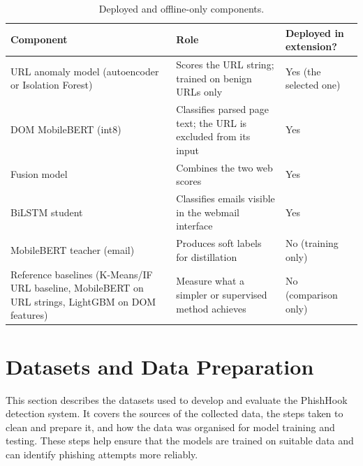 \documentclass{FastFyp}
\begin{document}
\begin{table}[!ht]
\centering
\caption{Deployed and offline-only components.}
\label{tab:components}
\begin{tabularx}{\textwidth}{|>{\raggedright\arraybackslash}X|>{\raggedright\arraybackslash}X|>{\raggedright\arraybackslash}X|}
\hline
\textbf{Component} & \textbf{Role} & \textbf{Deployed in extension?} \\
\hline
URL anomaly model (autoencoder or Isolation Forest) & Scores the URL string; trained on benign URLs only & Yes (the selected one) \\
\hline
DOM MobileBERT (int8) & Classifies parsed page text; the URL is excluded from its input & Yes \\
\hline
Fusion model & Combines the two web scores & Yes \\
\hline
BiLSTM student & Classifies emails visible in the webmail interface & Yes \\
\hline
MobileBERT teacher (email) & Produces soft labels for distillation & No (training only) \\
\hline
Reference baselines (K-Means/IF URL baseline, MobileBERT on URL strings, LightGBM on DOM features) & Measure what a simpler or supervised method achieves & No (comparison only) \\
\hline
\end{tabularx}
\end{table}

\section{Datasets and Data Preparation}
\label{sec:data}
This section describes the datasets used to develop and evaluate the PhishHook detection system. It covers the sources of the collected data, the steps taken to clean and prepare it, and how the data was organised for model training and testing. These steps help ensure that the models are trained on suitable data and can identify phishing attempts more reliably.
\end{document}
